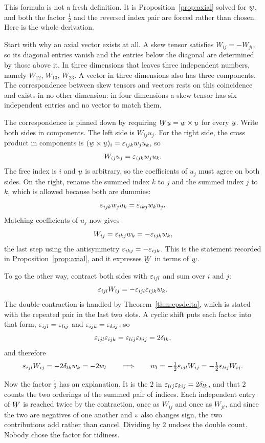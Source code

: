 \begin{remark}[where $w_{i}=\tfrac12\eps_{ijk}W_{kj}$ comes
from]\label{rem:axialformula}
This formula is not a fresh definition. It is
Proposition~\ref{prop:axial} solved for $\bw$, and both the factor
$\tfrac12$ and the reversed index pair are forced rather than chosen. Here
is the whole derivation.

Start with why an axial vector exists at all. A skew tensor satisfies
$W_{ij}=-W_{ji}$, so its diagonal entries vanish and the entries below the
diagonal are determined by those above it. In three dimensions that leaves
three independent numbers, namely $W_{12}$, $W_{13}$, $W_{23}$. A vector
in three dimensions also has three components. The correspondence between
skew tensors and vectors rests on this coincidence and exists in no other
dimension: in four dimensions a skew tensor has six independent entries
and no vector to match them.

The correspondence is pinned down by requiring $\bW\bu=\bw\times\bu$ for
every $\bu$. Write both sides in components. The left side is $W_{ij}
u_{j}$. For the right side, the cross product in components is
$(\bw\times\bu)_{i}=\eps_{ijk}w_{j}u_{k}$, so
\[
   W_{ij}u_{j}=\varepsilon_{ijk}w_{j}u_{k}.
\]
The free index is $i$ and $\bu$ is arbitrary, so the coefficients of
$u_{j}$ must agree on both sides. On the right, rename the summed index
$k$ to $j$ and the summed index $j$ to $k$, which is allowed because both
are dummies:
\[
   \varepsilon_{ijk}w_{j}u_{k}=\varepsilon_{ikj}w_{k}u_{j}.
\]
Matching coefficients of $u_{j}$ now gives
\[
   W_{ij}=\varepsilon_{ikj}w_{k}=-\varepsilon_{ijk}w_{k},
\]
the last step using the antisymmetry $\varepsilon_{ikj}=-\varepsilon_{ijk}$. This is the
statement recorded in Proposition~\ref{prop:axial}, and it expresses $\bW$
in terms of $\bw$.

To go the other way, contract both sides with $\varepsilon_{ijl}$ and sum over
$i$ and $j$:
\[
   \varepsilon_{ijl}W_{ij}=-\varepsilon_{ijl}\varepsilon_{ijk}w_{k}.
\]
The double contraction is handled by Theorem~\ref{thm:epsdelta}, which is
stated with the repeated pair in the last two slots. A cyclic shift puts
each factor into that form, $\varepsilon_{ijl}=\varepsilon_{lij}$ and
$\varepsilon_{ijk}=\varepsilon_{kij}$, so
\[
   \varepsilon_{ijl}\varepsilon_{ijk}=\varepsilon_{lij}\varepsilon_{kij}=2\delta_{lk},
\]
and therefore
\[
   \varepsilon_{ijl}W_{ij}=-2\delta_{lk}w_{k}=-2w_{l}
   \qquad\Longrightarrow\qquad
   w_{l}=-\tfrac12\varepsilon_{ijl}W_{ij}=-\tfrac12\varepsilon_{lij}W_{ij}.
\]

Now the factor $\tfrac12$ has an explanation. It is the $2$ in
$\varepsilon_{lij}\varepsilon_{kij}=2\delta_{lk}$, and that $2$ counts the two orderings of
the summed pair of indices. Each independent entry of $\bW$ is reached
twice by the contraction, once as $W_{ij}$ and once as $W_{ji}$, and since
the two are negatives of one another and $\varepsilon$ also changes sign, the two
contributions add rather than cancel. Dividing by $2$ undoes the double
count. Nobody chose the factor for tidiness.


\end{remark}
